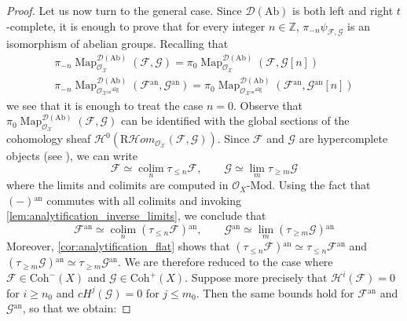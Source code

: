 \documentclass[12pt,a4paper,reqno]{amsart}
\theoremstyle{plain}
\theoremstyle{definition}
\theoremstyle{remark}
\numberwithin{equation}{section}
\begin{document}
\begin{proof}
	Let us now turn to the general case. Since ${{{\mathcal D}({\mathrm{Ab}})}}$ is both left and right $t$-complete, it is enough to prove that for every integer $n \in \mathbb Z$, $\pi_{-n} \psi_{{\mathcal F}, {\mathcal G}}$ is an isomorphism of abelian groups.
	Recalling that
	\begin{gather*}
		\pi_{-n} \operatorname{Map}^{{{\mathcal D}({\mathrm{Ab}})}}_{{\mathcal O}_{\mathcal X}}({\mathcal F}, {\mathcal G}) = \pi_0 \operatorname{Map}^{{{\mathcal D}({\mathrm{Ab}})}}_{{\mathcal O}_{\mathcal X}}({\mathcal F}, {\mathcal G}[n]) \\
		\pi_{-n} \operatorname{Map}^{{{\mathcal D}({\mathrm{Ab}})}}_{{\mathcal O}_{{\mathcal X}{^\mathrm{an}}}{^\mathrm{alg}}}({\mathcal F}{^\mathrm{an}}, {\mathcal G}{^\mathrm{an}}) = \pi_0 \operatorname{Map}^{{{\mathcal D}({\mathrm{Ab}})}}_{{\mathcal O}_{{\mathcal X}{^\mathrm{an}}}{^\mathrm{alg}}}({\mathcal F}{^\mathrm{an}}, {\mathcal G}{^\mathrm{an}}[n])
	\end{gather*}
	we see that it is enough to treat the case $n = 0$.
	Observe that $\pi_0 \operatorname{Map}^{{{\mathcal D}({\mathrm{Ab}})}}_{{\mathcal O}_{\mathcal X}}({\mathcal F}, {\mathcal G})$ can be identified with the global sections of the cohomology sheaf ${\mathcal H}^0( {{\mathrm R}\!\mathcal H\!\mathit{om}}_{{\mathcal O}_{\mathcal X}}({\mathcal F}, {\mathcal G}))$.
	Since ${\mathcal F}$ and ${\mathcal G}$ are hypercomplete objects (see \cite[Proposition 2.3.21]{DAG-VIII}), we can write
	\[ {\mathcal F} \simeq \operatorname*{colim}_n \tau_{\le n} {\mathcal F}, \qquad {\mathcal G} \simeq \lim_m \tau_{\ge m} {\mathcal G} \]
	where the limits and colimits are computed in ${\mathcal O}_X \textrm{-} {\mathrm{Mod}}$.
	Using the fact that $(-){^\mathrm{an}}$ commutes with all colimits and invoking \cref{lem:analytification_inverse_limits}, we conclude that
	\[ {\mathcal F}{^\mathrm{an}} \simeq \operatorname*{colim}_n (\tau_{\le n} {\mathcal F}){^\mathrm{an}}, \qquad {\mathcal G}{^\mathrm{an}} \simeq \lim_m (\tau_{\ge m} {\mathcal G}){^\mathrm{an}} \]
	Moreover, \cref{cor:analytification_flat} shows that $(\tau_{\le n} {\mathcal F}){^\mathrm{an}} \simeq \tau_{\le n} {\mathcal F}{^\mathrm{an}}$ and $(\tau_{\ge m} {\mathcal G}){^\mathrm{an}} \simeq \tau_{\ge m} {\mathcal G}{^\mathrm{an}}$.
	We are therefore reduced to the case where ${\mathcal F} \in {\mathrm{Coh}}^-(X)$ and ${\mathcal G} \in {\mathrm{Coh}}^+(X)$.
	Suppose more precisely that ${\mathcal H}^i({\mathcal F}) = 0$ for $i \ge n_0$ and $cH^j({\mathcal G}) = 0$ for $j \le m_0$.
	Then the same bounds hold for ${\mathcal F}{^\mathrm{an}}$ and ${\mathcal G}{^\mathrm{an}}$, so that we obtain:

\end{proof}
\end{document}
